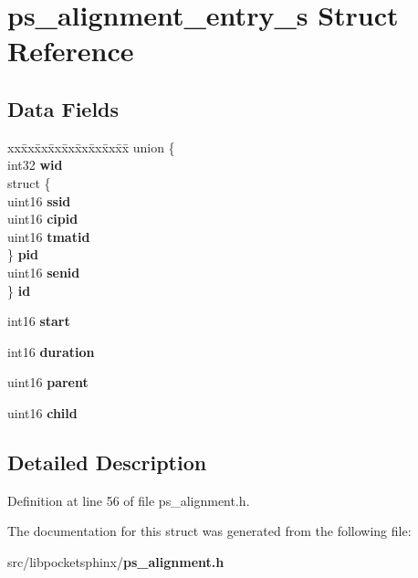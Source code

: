 \section{ps\-\_\-alignment\-\_\-entry\-\_\-s Struct Reference}
\label{structps__alignment__entry__s}
\subsection*{Data Fields}
\begin{DoxyCompactItemize}
\item 
\begin{tabbing}
xx\=xx\=xx\=xx\=xx\=xx\=xx\=xx\=xx\=\kill
union \{\\
\>int32 {\bfseries wid}\\
\>struct \{\\
\>\>uint16 {\bfseries ssid}\\
\>\>uint16 {\bfseries cipid}\\
\>\>uint16 {\bfseries tmatid}\\
\>\} {\bfseries pid}\\
\>uint16 {\bfseries senid}\\
\} {\bfseries id}\label{structps__alignment__entry__s_a3c41870e66f6813e327a29c1d9b8d3bc}
\\

\end{tabbing}\item 
int16 {\bfseries start}\label{structps__alignment__entry__s_ac3b469463845542c8d29b7c6c4e0f29e}

\item 
int16 {\bfseries duration}\label{structps__alignment__entry__s_ad5559bb3e102d94e614d6b0357bda3ad}

\item 
uint16 {\bfseries parent}\label{structps__alignment__entry__s_aef8dfacf69640a3ff88514298aa8f54a}

\item 
uint16 {\bfseries child}\label{structps__alignment__entry__s_a5f8b29052c7257a83af07018dddb7eff}

\end{DoxyCompactItemize}


\subsection{Detailed Description}


Definition at line 56 of file ps\-\_\-alignment.\-h.



The documentation for this struct was generated from the following file\-:\begin{DoxyCompactItemize}
\item 
src/libpocketsphinx/{\bf ps\-\_\-alignment.\-h}\end{DoxyCompactItemize}

